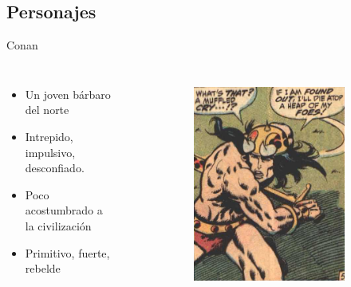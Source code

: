 \subsection{Personajes}
\begin{frame}{Conan}
\begin{columns}
\begin{itemize}
 \item Un joven bárbaro del norte
 \item Intrepido, impulsivo, desconfiado.
 \item Poco acostumbrado a la civilización
 \item Primitivo, fuerte, rebelde
\end{itemize}
\begin{figure}[htp]
 \centering
 \begin{subfigure}[b]{0.3\textwidth}
   \includegraphics[width=\textwidth]{img/conan/CTB}
 \end{subfigure}
~
 \begin{subfigure}[b]{0.27\textwidth}

\end{subfigure}
\end{figure}
\end{columns}
\end{frame}
